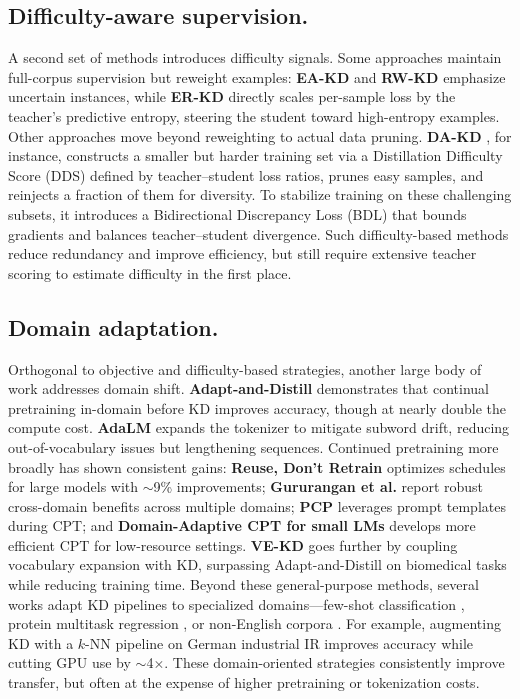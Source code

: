 \subsection{Difficulty-aware supervision.}
A second set of methods introduces difficulty signals. 
Some approaches maintain full-corpus supervision but reweight examples: \textbf{EA-KD} \cite{eakd} and \textbf{RW-KD} \cite{rwkd} emphasize uncertain instances, while \textbf{ER-KD} \cite{erkd} directly scales per-sample loss by the teacher’s predictive entropy, steering the student toward high-entropy examples. 
Other approaches move beyond reweighting to actual data pruning. 
\textbf{DA-KD} \cite{dakd}, for instance, constructs a smaller but harder training set via a Distillation Difficulty Score (DDS) defined by teacher–student loss ratios, prunes easy samples, and reinjects a fraction of them for diversity. To stabilize training on these challenging subsets, it introduces a Bidirectional Discrepancy Loss (BDL) that bounds gradients and balances teacher–student divergence. Such difficulty-based methods reduce redundancy and improve efficiency, but still require extensive teacher scoring to estimate difficulty in the first place.

\subsection{Domain adaptation.}
Orthogonal to objective and difficulty-based strategies, another large body of work addresses domain shift. 
\textbf{Adapt-and-Distill} \cite{adaptanddistill} demonstrates that continual pretraining in-domain before KD improves accuracy, though at nearly double the compute cost. 
\textbf{AdaLM} expands the tokenizer to mitigate subword drift, reducing out-of-vocabulary issues but lengthening sequences. Continued pretraining more broadly has shown consistent gains: 
\textbf{Reuse, Don’t Retrain} \cite{reuse2024} optimizes schedules for large models with $\sim$9\% improvements; 
\textbf{Gururangan et al.} \cite{gururangan2020don} report robust cross-domain benefits across multiple domains; 
\textbf{PCP} \cite{pcp2023} leverages prompt templates during CPT; and \textbf{Domain-Adaptive CPT for small LMs} \cite{domainadaptive2025} develops more efficient CPT for low-resource settings. 
\textbf{VE-KD} \cite{vekd2024} goes further by coupling vocabulary expansion with KD, surpassing Adapt-and-Distill on biomedical tasks while reducing training time. 
Beyond these general-purpose methods, several works adapt KD pipelines to specialized domains—few-shot classification \cite{adasent2023}, protein multitask regression \cite{selfprot2024}, or non-English corpora \cite{germanprocess2023}. For example, augmenting KD with a $k$-NN pipeline on German industrial IR improves accuracy while cutting GPU use by $\sim$4$\times$. 
These domain-oriented strategies consistently improve transfer, but often at the expense of higher pretraining or tokenization costs.

